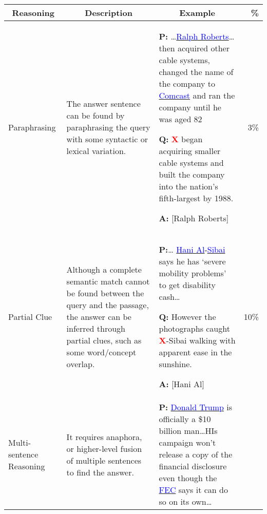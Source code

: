 \begin{table*}[!t]
\centering
\small
\begin{tabular}{@{}m{2cm}m{4.8cm}m{7cm}r@{}}
\toprule
\multicolumn{1}{c}{Reasoning} & \multicolumn{1}{c}{Description}                                                                                                                                                                                                             & \multicolumn{1}{c}{Example} & \multicolumn{1}{r}{\%} \\ \midrule
Paraphrasing                  & The answer sentence can be found by paraphrasing the query with some syntactic or lexical variation.                                                                                                               &    
\noindent\textbf{P:} \ldots\underline{\textcolor{blue}{Ralph Roberts}}\dots  then acquired other cable systems, changed the name of the company to \underline{\textcolor{blue}{Comcast}} and ran the company until he was aged 82

\noindent\textbf{Q:} \textcolor{red}{$\mathbf{X}$} began acquiring smaller cable systems and built the company into the nation's fifth-largest by 1988.

\noindent\textbf{A:} [Ralph Roberts]
& 3\%                            \\ \midrule
Partial Clue                  & Although a complete semantic match cannot be found between the query and the passage, the answer can be inferred through partial clues, such as some word/concept overlap. &     
\noindent\textbf{P:}\ldots
\underline{\textcolor{blue}{Hani Al}}-\underline{\textcolor{blue}{Sibai}} says he has `severe mobility problems' to get disability cash\ldots

\noindent\textbf{Q:} However the photographs caught \textcolor{red}{$\mathbf{X}$}-Sibai walking with apparent ease in the sunshine.

\noindent\textbf{A:} [Hani Al]
& 10\%                           \\ \midrule
Multi-sentence Reasoning      & It requires anaphora, or higher-level fusion of multiple sentences to find the answer.                                                                                                                                                      &      
\noindent\textbf{P:} \underline{\textcolor{blue}{Donald Trump}} is officially a \$10 billion man\ldots HIs campaign won't release a copy of the financial disclosure even though the \underline{\textcolor{blue}{FEC}} says it can do so on its own\ldots


\end{tabular}
\end{table*}
